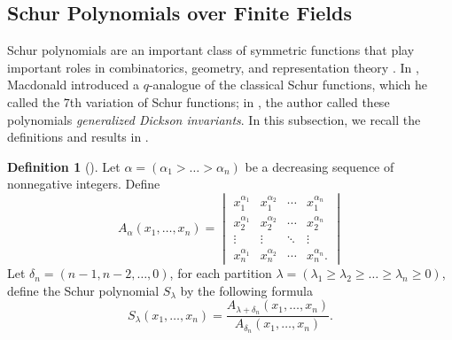 \documentclass[12pt,a4paper]{report}
\theoremstyle{definition}
\newtheorem{definition}[theorem]{Definition}
\theoremstyle{remark}
\theoremstyle{definition}
\begin{document}
\subsection{Schur Polynomials over Finite Fields}\label{subsection:schur_7}
Schur polynomials are an important class of symmetric functions that play important roles in combinatorics, geometry, and representation theory \cite{sagan_symmetric_2001, stanley_enumerative_1999}. In \cite[Section 7]{macdonald_schur_1992}, Macdonald introduced a $q$-analogue of the classical Schur functions, which he called the $7$th variation of Schur functions; in \cite{shinyao}, the author called these polynomials \emph{generalized Dickson invariants}. In this subsection, we recall the definitions and results in \cite[Section 7]{macdonald_schur_1992}. 
\begin{definition}[{\cite[(7.1)]{macdonald_schur_1992}}]\label{def:schur}
    Let $\alpha = (\alpha_1 > \ldots > \alpha_n)$ be a decreasing sequence of nonnegative integers. Define
    \begin{equation*}
        A_{\alpha}(x_1, \ldots, x_n) = \begin{vmatrix}
            x_1^{\alpha_1} & x_1^{\alpha_2} & \cdots  & x_1^{\alpha_n}\\
            x_2^{\alpha_1} & x_2^{\alpha_2} & \cdots  & x_2^{\alpha_n}\\
            \vdots & \vdots & \ddots & \vdots \\
            x_n^{\alpha_1} & x_n^{\alpha_2} & \cdots  & x_n^{\alpha_n}.
        \end{vmatrix}
    \end{equation*}
    Let $\delta_n= (n-1, n-2, \ldots, 0)$, for each partition $\lambda = (\lambda_1\geq \lambda_2 \geq \ldots \geq \lambda_n\geq 0)$, define the Schur polynomial $S_{\lambda}$ by the following formula
    \begin{equation*}
        S_{\lambda}(x_1, \ldots, x_n) = \dfrac{A_{\lambda + \delta_n}(x_1, \ldots, x_n)}{A_{\delta_n}(x_1, \ldots, x_n)}.
    \end{equation*}
\end{definition}
\end{document}
